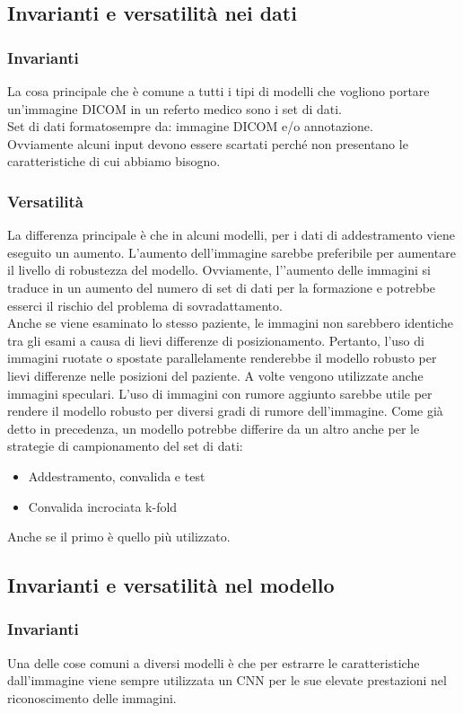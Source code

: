 \documentclass[12pt,a4paper]{report}
\begin{document}
\subsection{Invarianti e versatilità nei dati}
\subsubsection{Invarianti}
La cosa principale che è comune a tutti i tipi di modelli che vogliono portare un’immagine DICOM in un referto medico sono i set di dati.\\
Set di dati formatosempre  da: immagine DICOM e/o annotazione.\\
Ovviamente alcuni input devono essere scartati perché non presentano le caratteristiche di cui abbiamo bisogno.

\subsubsection{Versatilità}
La differenza principale è che in alcuni modelli, per i dati di addestramento viene eseguito un aumento. L'aumento dell'immagine sarebbe preferibile per aumentare il livello di robustezza del modello. Ovviamente, l’'aumento delle immagini si traduce in un aumento del numero di set di dati per la formazione e potrebbe esserci il rischio del problema di sovradattamento.\\
Anche se viene esaminato lo stesso paziente, le immagini non sarebbero identiche tra gli esami a causa di lievi differenze di posizionamento. Pertanto, l'uso di immagini ruotate o spostate parallelamente renderebbe il modello robusto per lievi differenze nelle posizioni del paziente. A volte vengono utilizzate anche immagini speculari. L'uso di immagini con rumore aggiunto sarebbe utile per rendere il modello robusto per diversi gradi di rumore dell'immagine.
Come già detto in precedenza, un modello potrebbe differire da un altro anche per le strategie di campionamento del set di dati:
\begin{itemize}
\item Addestramento, convalida e test
\item Convalida incrociata k-fold
\end{itemize}
Anche se il primo è quello più utilizzato.

\subsection{Invarianti e versatilità nel modello}
\subsubsection{Invarianti}
Una delle cose comuni a diversi modelli è che per estrarre le caratteristiche dall’immagine viene sempre utilizzata un CNN per le sue elevate prestazioni nel riconoscimento delle immagini.
\end{document}
